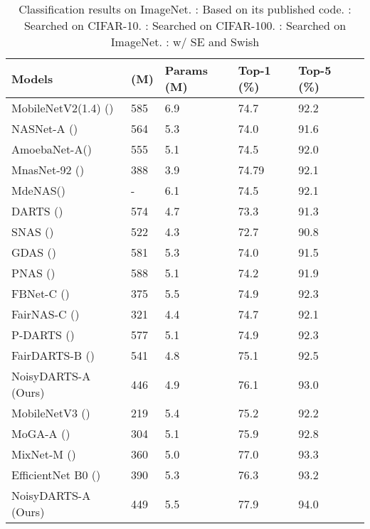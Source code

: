 \documentclass{article}
\newcommand{\citec}[1]{(\cite{#1})}
\begin{document}
\begin{table}
	\begin{center}
		\caption{Classification results on ImageNet. : Based on its published code. : Searched on CIFAR-10. : Searched on CIFAR-100. : Searched on ImageNet. : w/ SE and Swish} 
		\label{tab:comparison-imagenet}
		\begin{footnotesize}
			\begin{tabular}{*{6}{l}} 			
				\toprule
				Models &  (M)  &Params (M) & Top-1 (\%) & Top-5 (\%)  \\
\midrule 
				MobileNetV2(1.4) \citec{sandler2018mobilenetv2}   & 585 & 6.9 & 74.7 & 92.2 \\
				\midrule
				NASNet-A \citec{zoph2017learning}  & 564 & 5.3 &74.0 & 91.6\\
				AmoebaNet-A\citec{real2018regularized} & 555  & 5.1 & 74.5 &92.0\\
				MnasNet-92 \citec{tan2018mnasnet}  & 388 & 3.9 & 74.79 & 92.1 \\ 	
				MdeNAS\citec{zheng2019multinomial} & - & 6.1 & 74.5 & 92.1  \\
				\midrule
				DARTS \citec{liu2018darts} & 574 & 4.7 & 73.3 & 91.3\\
				SNAS \citec{xie2018snas}  &522&4.3&72.7&90.8 \\
				GDAS \citec{dong2019searching}  &581&5.3&74.0&91.5 \\
				PNAS \citec{liu2018progressive} & 588 & 5.1 & 74.2& 91.9 \\ 
				FBNet-C \citec{wu2018fbnet}   & 375 & 5.5 &  74.9 & 92.3  \\ 
FairNAS-C  \citec{chu2019fairnas} &321 & 4.4 & 74.7 &92.1  \\
				P-DARTS \citec{chen2019progressive}& 577 & 5.1 & 74.9 & 92.3  \\  FairDARTS-B \citec{chu2019fair}& 541 & 4.8 &75.1 & 92.5 \\
				NoisyDARTS-A (Ours) &446&4.9&76.1& 93.0\\
\midrule
				MobileNetV3 \citec{howard2019searching} & 219 & 5.4 &75.2 & 92.2 \\
				MoGA-A \citec{chumoga} & 304 & 5.1 & 75.9 & 92.8\\
				MixNet-M \citec{tan2020mixconv} &360 & 5.0 & 77.0 & 93.3\\
				EfficientNet B0 \citec{tan2019efficientnet} &390 & 5.3  & 76.3 & 93.2  \\
				NoisyDARTS-A (Ours) &449 & 5.5 & 77.9 & 94.0\\


\bottomrule
			\end{tabular}
		\end{footnotesize}
	\end{center}
\end{table}
\end{document}
